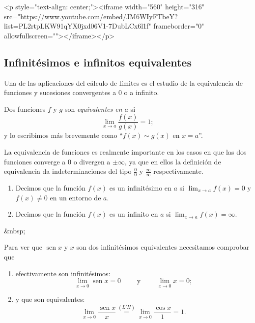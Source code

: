 \begin{rawhtml}
<p style="text-align: center;"><iframe width="560" height="316" src="https://www.youtube.com/embed/JM6WIyFTbeY?list=PL2rtpLKW91qYX0jxd06V1-7DubLCx6l1f" frameborder="0" allowfullscreen=""></iframe></p>
\end{rawhtml}

\subsection{Infinitésimos e infinitos equivalentes}

Una de las aplicaciones del cálculo de límites es el estudio de la equivalencia de funciones y sucesiones convergentes a 0 o a infinito.
%
\begin{definicion} 
Dos funciones $f$ y $g$ son
\emph{equivalentes en $a$} si 
\[
\lim_{x\to a}\dfrac{f(x)}{g(x)}=1;
\]
y lo escribimos más brevemente como ``$f(x)\sim g(x)$ en $x=a$''.
\end{definicion}

La equivalencia de funciones es realmente importante en los casos en que las dos funciones converge a 0 o divergen a $\pm\infty$, ya
que en ellos la definición de equivalencia da indeterminaciones del tipo $\frac{0}{0}$ y 
$\frac{\infty}{\infty}$ respectivamente. 
%
\begin{definicion-br}
\begin{enumerate}
\item
Decimos que la función $f(x)$ es un infinitésimo en $a$ si $\lim_{x\to a}f(x)=0$ y $f(x)\not= 0$
en un entorno
de $a$. 
\item
Decimos que la función $f(x)$ es un infinito en $a$ si $\displaystyle\lim_{x\to a}f(x)=\infty$.
\end{enumerate}
\end{definicion-br}
\begin{rawhtml}
&nbsp;
\end{rawhtml}
\begin{ejemplo}\label{ej:xsenx2}
Para ver que $\operatorname{sen} x$ y $x$ son dos infinitésimos equivalentes necesitamos comprobar que 
\begin{enumerate}
\item efectivamente son infinitésimos:
\[
\lim_{x\to 0}\operatorname{sen} x = 0 \qquad\mbox{ y }\qquad \lim_{x\to 0}x=0;
\]
\item y que son equivalentes:
\begin{equation}
\lim_{x\to 0}\dfrac{\operatorname{sen} x}{x} \stackrel{(L'H)}{=}
\lim_{x\to 0}\dfrac{\cos x}{1} = 1. \tag*{\fej}
\end{equation}
\end{enumerate}
\end{ejemplo}

